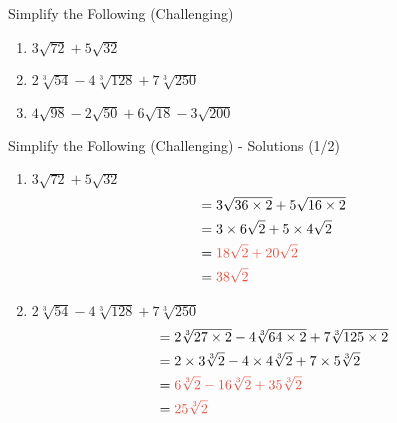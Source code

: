 \documentclass[aspectratio=169]{beamer}
\begin{document}
\begin{frame}{Simplify the Following (Challenging)}
\begin{tcolorbox}[colback=lightgray,colframe=accent,title=Practice Problems]
\footnotesize
\begin{enumerate}
  \item $3\sqrt{72} + 5\sqrt{32}$
  \item $2\sqrt[3]{54} - 4\sqrt[3]{128} + 7\sqrt[3]{250}$
  \item $4\sqrt{98} - 2\sqrt{50} + 6\sqrt{18} - 3\sqrt{200}$
\end{enumerate}
\end{tcolorbox}
\end{frame}

\begin{frame}{Simplify the Following (Challenging) - Solutions (1/2)}
\begin{tcolorbox}[colback=lightgray,colframe=primary,title=Full Solutions]
\footnotesize
\begin{enumerate}
  \item $3\sqrt{72} + 5\sqrt{32}$
  \begin{align*}
    &= 3\sqrt{36 \times 2} + 5\sqrt{16 \times 2} \\
    &= 3 \times 6\sqrt{2} + 5 \times 4\sqrt{2} \\
    &= \textcolor{accent}{18\sqrt{2} + 20\sqrt{2}} \\
    &= \textcolor{accent}{38\sqrt{2}}
  \end{align*}
  \item $2\sqrt[3]{54} - 4\sqrt[3]{128} + 7\sqrt[3]{250}$
  \begin{align*}
    &= 2\sqrt[3]{27 \times 2} - 4\sqrt[3]{64 \times 2} + 7\sqrt[3]{125 \times 2} \\
    &= 2 \times 3\sqrt[3]{2} - 4 \times 4\sqrt[3]{2} + 7 \times 5\sqrt[3]{2} \\
    &= \textcolor{accent}{6\sqrt[3]{2} - 16\sqrt[3]{2} + 35\sqrt[3]{2}} \\
    &= \textcolor{accent}{25\sqrt[3]{2}}
  \end{align*}
\end{enumerate}
\end{tcolorbox}
\end{frame}
\end{document}
